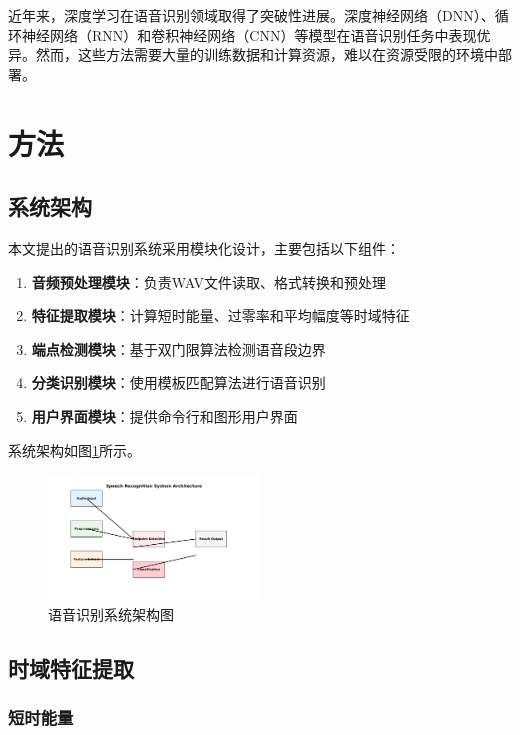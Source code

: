 \documentclass[sigconf,nonacm]{acmart}
\begin{document}
近年来，深度学习在语音识别领域取得了突破性进展。深度神经网络（DNN）、循环神经网络（RNN）和卷积神经网络（CNN）等模型在语音识别任务中表现优异。然而，这些方法需要大量的训练数据和计算资源，难以在资源受限的环境中部署。

\section{方法}

\subsection{系统架构}

本文提出的语音识别系统采用模块化设计，主要包括以下组件：

\begin{enumerate}
\item \textbf{音频预处理模块}：负责WAV文件读取、格式转换和预处理
\item \textbf{特征提取模块}：计算短时能量、过零率和平均幅度等时域特征
\item \textbf{端点检测模块}：基于双门限算法检测语音段边界
\item \textbf{分类识别模块}：使用模板匹配算法进行语音识别
\item \textbf{用户界面模块}：提供命令行和图形用户界面
\end{enumerate}

系统架构如图\ref{fig:system_architecture}所示。

\begin{figure}[htbp]
\centering
\includegraphics[width=0.5\textwidth]{system_architecture.png}
\caption{语音识别系统架构图}
\label{fig:system_architecture}
\end{figure}

\subsection{时域特征提取}

\subsubsection{短时能量}
\end{document}
